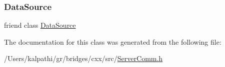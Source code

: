 \subsubsection{\texorpdfstring{DataSource}{DataSource}}
{\footnotesize\ttfamily friend class \mbox{\hyperlink{classbridges_1_1_data_source}{Data\+Source}}\hspace{0.3cm}{\ttfamily [friend]}}



The documentation for this class was generated from the following file\+:\begin{DoxyCompactItemize}
\item 
/\+Users/kalpathi/gr/bridges/cxx/src/\mbox{\hyperlink{_server_comm_8h}{Server\+Comm.\+h}}\end{DoxyCompactItemize}
